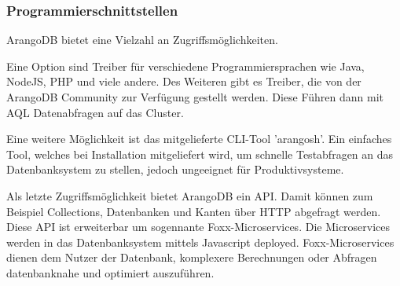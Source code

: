 \subsubsection{Programmierschnittstellen}
ArangoDB bietet eine Vielzahl an Zugriffsmöglichkeiten.

Eine Option sind Treiber für verschiedene Programmiersprachen wie Java, NodeJS, PHP und viele andere. Des Weiteren gibt es Treiber, die von der ArangoDB Community zur Verfügung gestellt werden. \cite{ADB_driver} Diese Führen dann mit \ac{AQL} Datenabfragen auf das Cluster. 

Eine weitere Möglichkeit ist das mitgelieferte \ac{CLI}-Tool 'arangosh'. Ein einfaches Tool, welches bei Installation mitgeliefert wird, um schnelle Testabfragen an das Datenbanksystem zu stellen, jedoch ungeeignet für Produktivsysteme. \cite{ADB_arangosh}

Als letzte Zugriffsmöglichkeit bietet ArangoDB ein \ac{API}. Damit können zum Beispiel Collections, Datenbanken und Kanten über \ac{HTTP} abgefragt werden. \cite{ADB_api} Diese \ac{API} ist erweiterbar um sogennante Foxx-Microservices. Die Microservices werden in das Datenbanksystem mittels Javascript deployed. Foxx-Microservices dienen dem Nutzer der Datenbank, komplexere Berechnungen oder Abfragen datenbanknahe und optimiert auszuführen. \cite{ADB_foxx}
